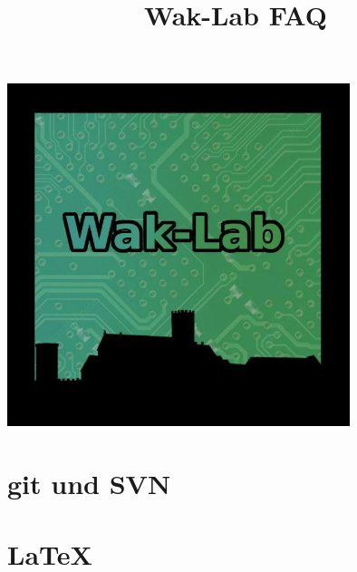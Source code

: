 

\title{Wak-Lab FAQ}


\maketitle

\maketitle
\begin{center}
\includegraphics[height=10cm]{pictures/LOGO.jpg}
\end{center}
\newpage
\section{git und SVN}

\section{\LaTeX}




